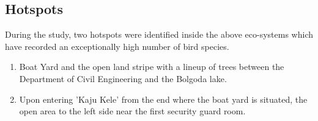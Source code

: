 \subsection{Hotspots}
During the study, two hotspots were identified inside the above eco-systems which have recorded an exceptionally high number of bird species.
\begin{enumerate}
    \item  Boat Yard and the open land stripe with a lineup of trees between the Department of Civil Engineering and the Bolgoda lake.
    \item Upon entering 'Kaju Kele' from the end where the boat yard is situated, the open area to the left side near the first security guard room.
\end{enumerate}
